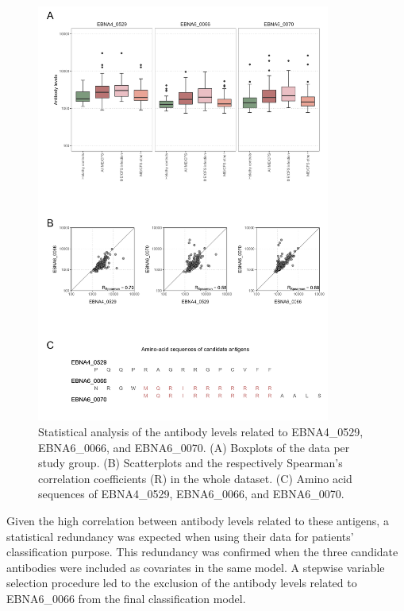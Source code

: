 \begin{figure}
    \centering
    \includegraphics[width=0.86\textwidth]{chapter/2022-revisiting-igg/figures/fig3-analysis-of-abs-levels.png}
    \caption[Statistical analysis of the antibody levels related to EBNA4\_0529, EBNA6\_0066, and EBNA6\_0070]{Statistical analysis of the antibody levels related to EBNA4\_0529, EBNA6\_0066, and EBNA6\_0070. (A) Boxplots of the data per study group. (B) Scatterplots and the respectively Spearman's correlation coefficients (R) in the whole dataset. (C) Amino acid sequences of EBNA4\_0529, EBNA6\_0066, and EBNA6\_0070.}
    \label{fig:fig3-analysis-of-abs-levels}
\end{figure}

Given the high correlation between antibody levels related to these antigens, a statistical redundancy was expected when using their data for patients' classification purpose. This redundancy was confirmed when the three candidate antibodies were included as covariates in the same model. A stepwise variable selection procedure led to the exclusion of the antibody levels related to EBNA6\_0066 from the final classification model.

